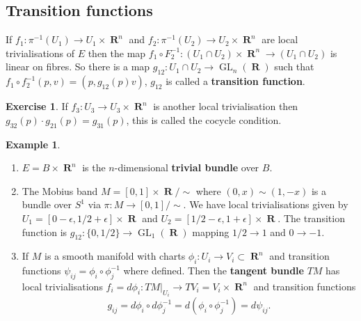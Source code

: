 \documentclass[10pt,]{book}
\newcommand{\terminology}[1]{\textbf{#1}}
\theoremstyle{plain}
\theoremstyle{definition}
\newtheorem{example}[theorem]{Example}
\newtheorem{exercise}[theorem]{Exercise}
\numberwithin{equation}{section}
\DeclareMathOperator{\GL}{GL}
\DeclareMathOperator{\RR}{\mathbf{R}}
\begin{document}
\subsection[Transition functions]{Transition functions}\label{subsection-13}
If \(f_1\colon \pi^{-1}(U_1) \to U_1\times \RR^n\) and \(f_2\colon \pi^{-1}(U_2) \to U_2\times \RR^n\) are local trivialisations of \(E\) then the map \(f_1\circ F_2^{-1}\colon (U_1\cap U_2)\times \RR^n \to (U_1 \cap U_2)\) is linear on fibres.
            So there is a map \(g_{12}\colon U_1\cap U_2 \to \GL_n(\RR)\) such that \(f_1\circ f_2^{-1}(p,v) = (p,g_{12}(p) v)\), \(g_{12}\) is called a \terminology{transition function}.%
\begin{exercise}\label{exercise-5}
If \(f_3\colon U_3 \to U_3\times \RR^n \) is another local trivialisation then \(g_{32}(p)\cdot g_{21}(p) = g_{31}(p)\), this is called the cocycle condition.\end{exercise}
\begin{example}\label{example-27}
\begin{enumerate}
\item{}\(E = B\times \RR^n\) is the \(n\)-dimensional \terminology{trivial bundle} over \(B\).\item{}The Mobius band \(M = [0,1] \times \RR/\sim\) where \((0,x)\sim (1,-x)\) is a bundle over \(S^1\) via \(\pi\colon M \to [0,1]/\sim\).
                  We have local trivialisations given by \(U_1 = [0-\epsilon, 1/2 + \epsilon]\times \RR\) and \(U_2 = [1/2-\epsilon, 1 + \epsilon]\times \RR\).
                  The transition function is \(g_{12} \colon \{0,1/2\} \to \GL_1(\RR)\) mapping \(1/2\to 1\) and \(0\to -1\).
                \item{}If \(M\) is a smooth manifold with charts \(\phi_i \colon U_i \to V_i \subset \RR^n\) and transition functions \(\psi_{ij} = \phi_i \circ \phi_j ^{-1}\) where defined.
                  Then the \terminology{tangent bundle} \(TM\) has local trivialisations \(f_i = d\phi_i\colon TM|_{U_i}\to TV_i = V_i\times \RR^n\) and transition functions
                  \[g_{ij} = d\phi_i\circ d\phi_j^{-1} = d(\phi_i\circ \phi_j^{-1}) = d\psi_{ij}.\]
                \end{enumerate}
\end{example}
%
\backmatter
%
\end{document}
